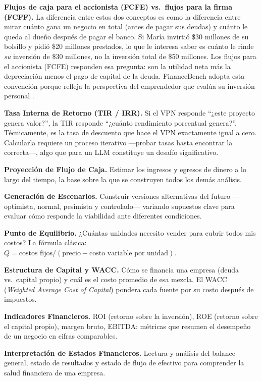 \documentclass[12pt,a4paper]{article}
\begin{document}
\textbf{Flujos de caja para el accionista (FCFE) vs.\ flujos para la firma (FCFF).} La diferencia entre estos dos conceptos es como la diferencia entre mirar cuánto gana un negocio en total (antes de pagar sus deudas) y cuánto le queda al dueño después de pagar el banco. Si María invirtió \$30 millones de su bolsillo y pidió \$20 millones prestados, lo que le interesa saber es cuánto le rinde \textit{su} inversión de \$30 millones, no la inversión total de \$50 millones. Los flujos para el accionista (FCFE) responden esa pregunta: son la utilidad neta más la depreciación menos el pago de capital de la deuda. FinanceBench adopta esta convención porque refleja la perspectiva del emprendedor que evalúa su inversión personal \citep{SapagChain2014, BerkDeMarzo2020}.

\textbf{Tasa Interna de Retorno (TIR / IRR).} Si el VPN responde ``¿este proyecto genera valor?'', la TIR responde ``¿cuánto rendimiento porcentual genera?''. Técnicamente, es la tasa de descuento que hace el VPN exactamente igual a cero. Calcularla requiere un proceso iterativo ---probar tasas hasta encontrar la correcta---, algo que para un LLM constituye un desafío significativo.

\textbf{Proyección de Flujo de Caja.} Estimar los ingresos y egresos de dinero a lo largo del tiempo, la base sobre la que se construyen todos los demás análisis.

\textbf{Generación de Escenarios.} Construir versiones alternativas del futuro ---optimista, normal, pesimista y controlado--- variando supuestos clave para evaluar cómo responde la viabilidad ante diferentes condiciones.

\textbf{Punto de Equilibrio.} ¿Cuántas unidades necesito vender para cubrir todos mis costos? La fórmula clásica: $Q = \text{costos fijos} / (\text{precio} - \text{costo variable por unidad})$.

\textbf{Estructura de Capital y WACC.} Cómo se financia una empresa (deuda vs.\ capital propio) y cuál es el costo promedio de esa mezcla. El WACC (\textit{Weighted Average Cost of Capital}) pondera cada fuente por su costo después de impuestos.

\textbf{Indicadores Financieros.} ROI (retorno sobre la inversión), ROE (retorno sobre el capital propio), margen bruto, EBITDA: métricas que resumen el desempeño de un negocio en cifras comparables.

\textbf{Interpretación de Estados Financieros.} Lectura y análisis del balance general, estado de resultados y estado de flujo de efectivo para comprender la salud financiera de una empresa.
\end{document}
